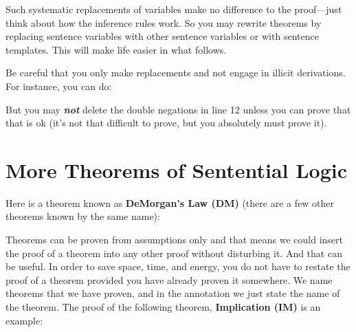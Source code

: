 Such systematic replacements of variables make no difference to the proof---just 
think about how the inference rules work.  So you may rewrite theorems by 
replacing sentence variables with other sentence variables or with sentence 
templates.  This will make life easier in what follows.

Be careful that you only make replacements and not engage in illicit 
derivations. For instance, you can do:

\begin{argument}
 \aitem {}
 \aitem {}
\end{argument}

But you may \emph{\textbf{not}} delete the double negations in line 12  unless 
you can prove that that is ok (it's not that difficult to prove, but you 
absolutely must prove it). 





\section{More Theorems of Sentential Logic}\label{sec:theoremList}

Here is a theorem known as \textbf{DeMorgan's Law (DM)} (there are a few other 
theorems known by the same name):




Theorems can be proven from assumptions only and that means we could insert the 
proof of a theorem into any other proof without disturbing it.  And that can be 
useful. In order to save space, time, and energy, you do not have to restate the 
proof of a theorem provided you have already proven it somewhere. We name 
theorems that we have proven, and in the annotation we just state the name of 
the theorem.  The proof of the following theorem, \textbf{Implication (IM)}
is an example:


